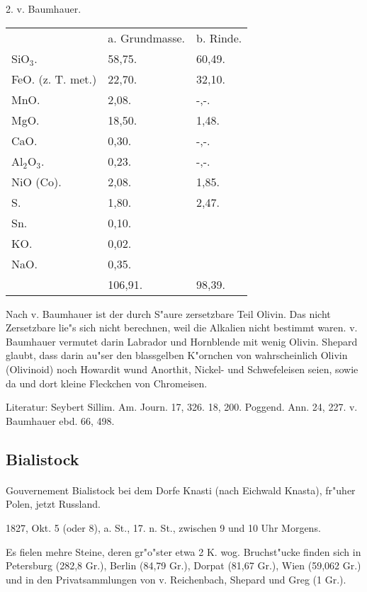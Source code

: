 \documentclass[a4paper, 11pt, oneside]{article}
\begin{document}
2. v. Baumhauer.
\begin{table}[!ht]
    \centering
    \begin{tabular}{l l l}
        & a. Grundmasse. & b. Rinde. \\
        SiO$_{3}$. & 58,75. & 60,49. \\
        FeO. (z. T. met.) & 22,70. & 32,10. \\
        MnO. & 2,08. & -,-. \\
        MgO. & 18,50. & 1,48. \\
        CaO. & 0,30. & -,-. \\
        Al$_{2}$O$_{3}$. & 0,23. & -,-. \\
        NiO (Co). & 2,08. & 1,85. \\
        S. & 1,80. & 2,47. \\
        Sn. & 0,10. &  \\
        KO. & 0,02. &  \\
        NaO. & 0,35. &  \\ \hline
         & 106,91. & 98,39. \\
    \end{tabular}
\end{table}

Nach v. Baumhauer ist der durch S"aure zersetzbare Teil Olivin. Das nicht Zersetzbare lie"s sich nicht berechnen, weil die Alkalien nicht bestimmt waren. v. Baumhauer vermutet darin Labrador und Hornblende mit wenig Olivin. Shepard glaubt, dass darin au"ser den blassgelben K"ornchen von wahrscheinlich Olivin (Olivinoid) noch Howardit wund Anorthit, Nickel- und Schwefeleisen seien, sowie da und dort kleine Fleckchen von Chromeisen.

\footnotesize
Literatur: Seybert Sillim. Am. Journ. 17, 326. 18, 200. Poggend. Ann. 24, 227. v. Baumhauer ebd. 66, 498.

\subsection{Bialistock}
\normalsize
\paragraph{}
Gouvernement Bialistock bei dem Dorfe Knasti (nach Eichwald Knasta), fr"uher Polen, jetzt Russland.

1827, Okt. 5 (oder 8), a. St., 17. n. St., zwischen 9 und 10 Uhr Morgens.

Es fielen mehre Steine, deren gr"o"ster etwa 2 K. wog. Bruchst"ucke finden sich in Petersburg (282,8 Gr.), Berlin (84,79 Gr.), Dorpat (81,67 Gr.), Wien (59,062 Gr.) und in den Privatsammlungen von v. Reichenbach, Shepard und Greg (1 Gr.).
\end{document}
